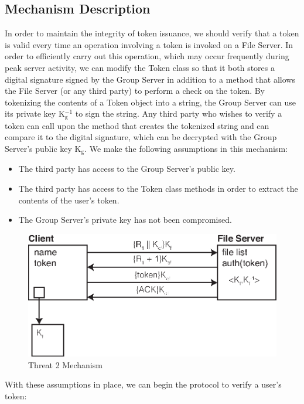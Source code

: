\documentclass[11pt]{article}
\begin{document}
\subsection{Mechanism Description}
In order to maintain the integrity of token issuance, we should verify that a token is valid every time an operation involving a token is invoked on a File Server. In order to efficiently carry out this operation, which may occur frequently during peak server activity, we can modify the Token class so that it both stores a digital signature signed by the Group Server in addition to a method that allows the File Server (or any third party) to perform a check on the token. By tokenizing the contents of a Token object into a string, the Group Server can use its private key K$_\text{g}^{-1}$ to sign the string. Any third party who wishes to verify a token can call upon the method that creates the tokenized string and can compare it to the digital signature, which can be decrypted with the Group Server's public key K$_\text{g}$. We make the following assumptions in this mechanism:
\begin{itemize}
\item{}The third party has access to the Group Server's public key.
\item{}The third party has access to the Token class methods in order to extract the contents of the user's token.
\item{}The Group Server's private key has not been compromised.
\end{itemize}
\begin{figure}[htbp]
\begin{center}
\includegraphics{threat2.eps}
\caption{Threat 2 Mechanism}
\label{threat2}
\end{center}
\end{figure}
With these assumptions in place, we can begin the protocol to verify a user's token:
\end{document}

